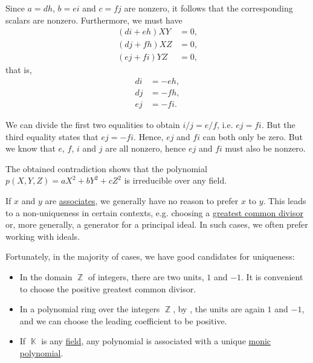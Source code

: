 \begin{example}
\begin{thmenum}
    Since \( a = dh \), \( b = ei \) and \( c = fj \) are nonzero, it follows that the corresponding scalars are nonzero. Furthermore, we must have
    \begin{align*}
      (d i + e h) X Y &= 0, \\
      (d j + f h) X Z &= 0, \\
      (e j + f i) Y Z &= 0,
    \end{align*}
    that is,
    \begin{align*}
      d i &= - e h, \\
      d j &= - f h, \\
      e j &= - f i.
    \end{align*}

    We can divide the first two equalities to obtain \( i / j = e / f \), i.e. \( ej = fi \). But the third equality states that \( ej = -fi \). Hence, \( ej \) and \( fi \) can both only be zero. But we know that \( e \), \( f \), \( i \) and \( j \) are all nonzero, hence \( ej \) and \( fi \) must also be nonzero.

    The obtained contradiction shows that the polynomial \( p(X, Y, Z) = a X^2 + b Y^2 + c Z^2 \) is irreducible over any field.
  \end{thmenum}
\end{example}

\begin{remark}\label{rem:choice_of_associates}
  If \( x \) and \( y \) are \hyperref[def:domain_divisibility/associates]{associates}, we generally have no reason to prefer \( x \) to \( y \). This leads to a non-uniqueness in certain contexts, e.g. choosing a \hyperref[def:gcd_and_lcm]{greatest common divisor} or, more generally, a generator for a principal ideal. In such cases, we often prefer working with ideals.

  Fortunately, in the majority of cases, we have good candidates for uniqueness:
  \begin{itemize}
    \item In the domain \( \BbbZ \) of integers, there are two units, \( 1 \) and \( -1 \). It is convenient to choose the positive greatest common divisor.

    \item In a polynomial ring over the integers \( \BbbZ \), by , the units are again \( 1 \) and \( -1 \), and we can choose the leading coefficient to be positive.

    \item If \( \BbbK \) is any \hyperref[def:field]{field}, any polynomial is associated with a unique \hyperref[def:monic_polynomial]{monic polynomial}.
  \end{itemize}
\end{remark}

